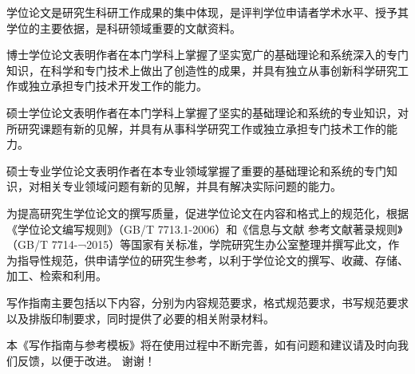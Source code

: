 
\begin{CHSabstract}
    学位论文是研究生科研工作成果的集中体现，是评判学位申请者学术水平、授予其学位的主要依据，是科研领域重要的文献资料。

博士学位论文表明作者在本门学科上掌握了坚实宽广的基础理论和系统深入的专门知识，在科学和专门技术上做出了创造性的成果，并具有独立从事创新科学研究工作或独立承担专门技术开发工作的能力。

硕士学位论文表明作者在本门学科上掌握了坚实的基础理论和系统的专业知识，对所研究课题有新的见解，并具有从事科学研究工作或独立承担专门技术工作的能力。

硕士专业学位论文表明作者在本专业领域掌握了重要的基础理论和系统的专门知识，对相关专业领域问题有新的见解，并具有解决实际问题的能力。

为提高研究生学位论文的撰写质量，促进学位论文在内容和格式上的规范化，根据《学位论文编写规则》（GB/T 7713.1-2006）和《信息与文献 参考文献著录规则》（GB/T 7714-¬2015）等国家有关标准，学院研究生办公室整理并撰写此文，作为指导性规范，供申请学位的研究生参考，以利于学位论文的撰写、收藏、存储、加工、检索和利用。

写作指南主要包括以下内容，分别为内容规范要求，格式规范要求，书写规范要求以及排版印制要求，同时提供了必要的相关附录材料。

本《写作指南与参考模板》将在使用过程中不断完善，如有问题和建议请及时向我们反馈，以便于改进。 谢谢！

\end{CHSabstract}

\begin{ENGabstract}
	\lipsum
\end{ENGabstract}


